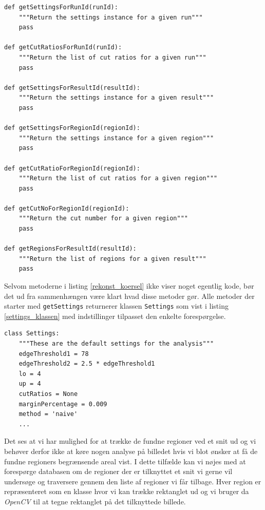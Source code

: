 {\vspace{0.5cm}
\begin{lstlisting}[caption={Metoder til rekonstruktion af kørsler},captionpos=b,label={rekonst_koersel},numbers=none]
def getSettingsForRunId(runId):
    """Return the settings instance for a given run"""
    pass

def getCutRatiosForRunId(runId):
    """Return the list of cut ratios for a given run"""
    pass

def getSettingsForResultId(resultId):
    """Return the settings instance for a given result"""
    pass

def getSettingsForRegionId(regionId):
    """Return the settings instance for a given region"""
    pass

def getCutRatioForRegionId(regionId):
    """Return the list of cut ratios for a given region"""
    pass

def getCutNoForRegionId(regionId):
    """Return the cut number for a given region"""
    pass

def getRegionsForResultId(resultId):
    """Return the list of regions for a given result"""
    pass
\end{lstlisting}

Selvom metoderne i listing \ref{rekonst_koersel} ikke viser noget
egentlig kode, bør det ud fra sammenhængen være klart hvad disse metoder
gør. Alle metoder der starter med \texttt{getSettings} returnerer
klassen \texttt{Settings} som vist i listing \ref{settings_klassen} med
indstillinger tilpasset den enkelte forespørgelse.
\vspace{0.5cm}
\begin{lstlisting}[caption={Settings-klassen med standardindstillinger},captionpos=b,label={settings_klassen},numbers=none]
class Settings:
    """These are the default settings for the analysis"""
    edgeThreshold1 = 78
    edgeThreshold2 = 2.5 * edgeThreshold1
    lo = 4
    up = 4
    cutRatios = None
    marginPercentage = 0.009
    method = 'naive'
    ...
\end{lstlisting}

Det ses at vi har mulighed for at trække de fundne regioner ved et
snit ud og vi behøver derfor ikke at køre nogen analyse på billedet hvis
vi blot ønsker at få de fundne regioners begrænsende areal vist. I dette
tilfælde kan vi nøjes med at forespørge databasen om de regioner der er
tilknyttet et snit vi gerne vil undersøge og traversere gennem den liste
af regioner vi får tilbage. Hver region er repræsenteret som en klasse
hvor vi kan trække rektanglet ud og vi bruger da \emph{OpenCV} til at
tegne rektanglet på det tilknyttede billede.

}
